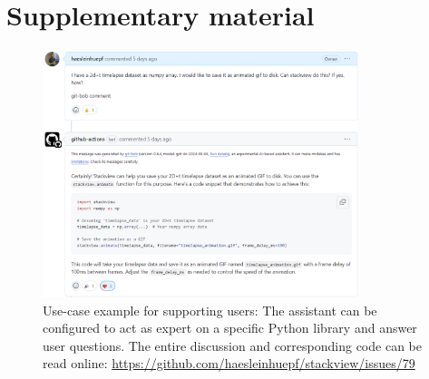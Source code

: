 \documentclass{ecai}
\begin{document}




\section{Supplementary material}
\setcounter{figure}{0} 
\renewcommand{\thefigure}{S\arabic{figure}}




\begin{figure}[h]
\centering
\includegraphics[width=0.82\textwidth]{example_supporting_users.png}
\caption{Use-case example for supporting users: The assistant can be configured to act as expert on a specific Python library and answer user questions. The entire discussion and corresponding code can be read online: \url{https://github.com/haesleinhuepf/stackview/issues/79}
\newline
\newline
}
\label{fig:examplesupportingusers}
\end{figure}
\end{document}
